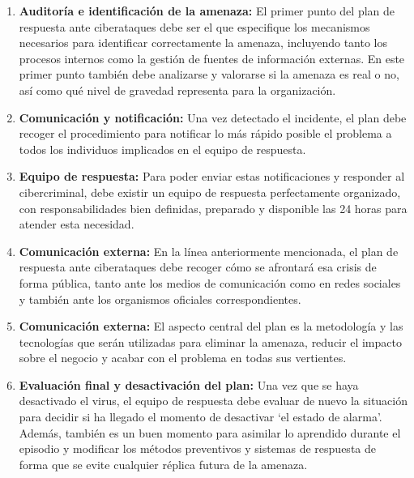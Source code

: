 \begin{enumerate}

\item {\bfseries Auditoría e identificación de la amenaza:}
El primer punto del plan de respuesta ante ciberataques debe ser el que especifique los mecanismos 
necesarios para identificar correctamente la amenaza, incluyendo tanto los procesos internos como
la gestión de fuentes de información externas. En este primer punto también debe analizarse y 
valorarse si la amenaza es real o no, así como qué nivel de gravedad representa para la organización.

\item {\bfseries Comunicación y notificación:}
Una vez detectado el incidente, el plan debe recoger el procedimiento para notificar lo más rápido 
posible el problema a todos los individuos implicados en el equipo de respuesta.

\item {\bfseries Equipo de respuesta:}
Para poder enviar estas notificaciones y responder al cibercriminal, debe existir un equipo de respuesta 
perfectamente organizado, con responsabilidades bien definidas, preparado y disponible las 24 horas 
para atender esta necesidad.

\item {\bfseries Comunicación externa:}
En la línea anteriormente mencionada, el plan de respuesta ante ciberataques debe recoger cómo se 
afrontará esa crisis de forma pública, tanto ante los medios de comunicación como en redes sociales 
y también ante los organismos oficiales correspondientes.

\item {\bfseries Comunicación externa:}
El aspecto central del plan es la metodología y las tecnologías que serán utilizadas para eliminar la 
amenaza, reducir el impacto sobre el negocio y acabar con el problema en todas sus vertientes.

\item {\bfseries Evaluación final y desactivación del plan:}
Una vez que se haya desactivado el virus, el equipo de respuesta debe evaluar de nuevo la situación 
para decidir si ha llegado el momento de desactivar ‘el estado de alarma’. Además, también es un buen 
momento para asimilar lo aprendido durante el episodio y modificar los métodos preventivos y sistemas 
de respuesta de forma que se evite cualquier réplica futura de la amenaza.

\end{enumerate}




